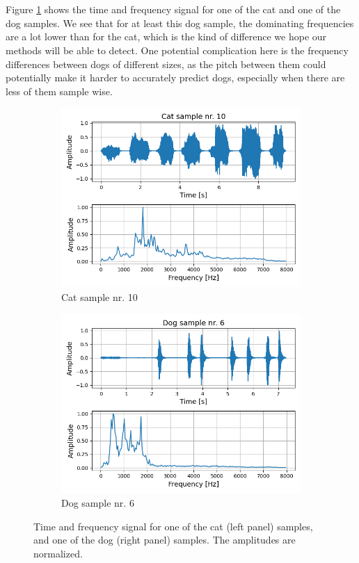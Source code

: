 \documentclass[a4paper]{article}
\begin{document}
\\\\
Figure \ref{fig:cat_dog_samples} shows the time and frequency signal for one of the cat and one of the dog samples. We see that for at least this dog sample, the dominating frequencies are a lot lower than for the cat, which is the kind of difference we hope our methods will be able to detect. One potential complication here is the frequency differences between dogs of different sizes, as the pitch between them could potentially make it harder to accurately predict dogs, especially when there are less of them sample wise.
\begin{figure}[H]
	\centering
	\begin{subfigure}{0.49\textwidth}
		\includegraphics[scale=0.45]{../figures/cat_10_nbins200.png}
		\caption{Cat sample nr. 10}
	\end{subfigure}
	\begin{subfigure}{0.49\textwidth}
		\includegraphics[scale=0.45]{../figures/dog_6_nbins200.png}
		\caption{Dog sample nr. 6}
	\end{subfigure}
	\caption{Time and frequency signal for one of the cat (left panel) samples, and one of the dog (right panel) samples. The amplitudes are normalized.}
	\label{fig:cat_dog_samples}
\end{figure}
\end{document}
